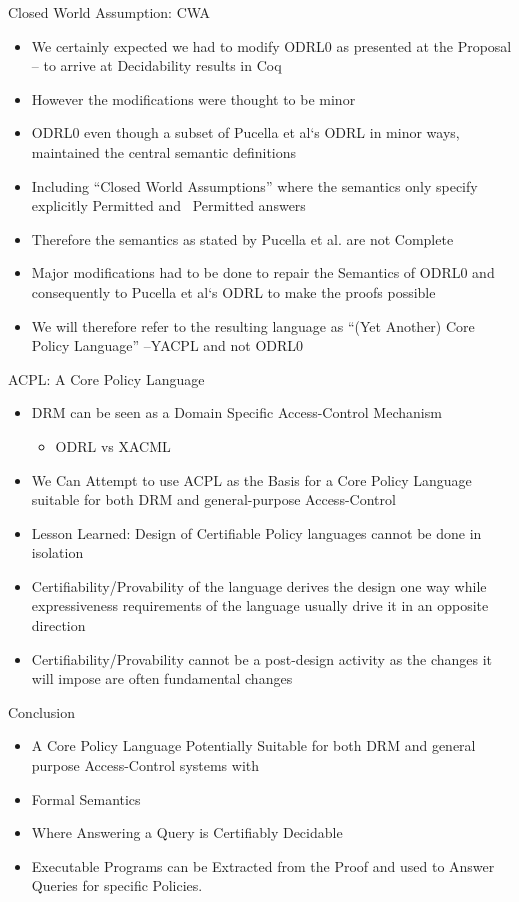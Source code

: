 \documentclass{beamer}
\begin{document}
\begin{frame}[fragile]{Closed World Assumption: CWA}
\begin{itemize}
\item We certainly expected we had to modify ODRL0 as presented at the Proposal -- to arrive at Decidability results in Coq
\item However the modifications were thought to be minor
\item ODRL0 even though a subset of Pucella et al`s ODRL in minor ways, maintained the central semantic definitions
\item Including ``Closed World Assumptions'' where the semantics only specify explicitly Permitted and ~Permitted answers
\item Therefore the semantics as stated by Pucella et al. are not Complete
\item Major modifications had to be done to repair the Semantics of ODRL0 and consequently to Pucella et al`s ODRL to make the proofs possible
\item We will therefore refer to the resulting language as ``(Yet Another) Core Policy Language''  --YACPL and not ODRL0 
\end{itemize}
\end{frame}
\begin{frame}[fragile]{ACPL: A Core Policy Language}
\small
\begin{itemize}
\item DRM can be seen as a Domain Specific Access-Control Mechanism
    \begin{itemize}
       \item ODRL vs XACML
   \end{itemize}
\item We Can Attempt to use ACPL as the Basis for a Core Policy Language suitable for both DRM and general-purpose Access-Control
\item Lesson Learned: Design of Certifiable Policy languages cannot be done in isolation
\item Certifiability/Provability of the language derives the design one way while expressiveness requirements of the language usually drive it in an opposite direction
\item Certifiability/Provability cannot be a post-design activity as the changes it will impose are often fundamental changes
\end{itemize}
\end{frame}
\begin{frame}[fragile]{Conclusion}
\Large
\begin{itemize}
\item A Core Policy Language Potentially Suitable for both DRM and general purpose Access-Control systems with 
\item Formal Semantics 
\item Where Answering a Query is Certifiably Decidable
\item Executable Programs can be Extracted from the Proof and used to Answer Queries for specific Policies.
\end{itemize}
\end{frame}
\end{document}
